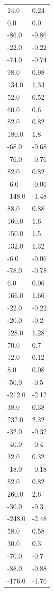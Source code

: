 \begin{longtable}{ll}
24.0 & 0.24 \\
0.0 & 0.0 \\
-86.0 & -0.86 \\
-22.0 & -0.22 \\
-74.0 & -0.74 \\
98.0 & 0.98 \\
134.0 & 1.34 \\
52.0 & 0.52 \\
60.0 & 0.6 \\
82.0 & 0.82 \\
180.0 & 1.8 \\
-68.0 & -0.68 \\
-76.0 & -0.76 \\
82.0 & 0.82 \\
-6.0 & -0.06 \\
-148.0 & -1.48 \\
88.0 & 0.88 \\
160.0 & 1.6 \\
150.0 & 1.5 \\
132.0 & 1.32 \\
-6.0 & -0.06 \\
-78.0 & -0.78 \\
6.0 & 0.06 \\
166.0 & 1.66 \\
-22.0 & -0.22 \\
-20.0 & -0.2 \\
128.0 & 1.28 \\
70.0 & 0.7 \\
12.0 & 0.12 \\
8.0 & 0.08 \\
-50.0 & -0.5 \\
-212.0 & -2.12 \\
38.0 & 0.38 \\
232.0 & 2.32 \\
-32.0 & -0.32 \\
-40.0 & -0.4 \\
32.0 & 0.32 \\
-18.0 & -0.18 \\
82.0 & 0.82 \\
260.0 & 2.6 \\
-30.0 & -0.3 \\
-248.0 & -2.48 \\
58.0 & 0.58 \\
30.0 & 0.3 \\
-70.0 & -0.7 \\
-88.0 & -0.88 \\
-176.0 & -1.76 \\

\end{longtable}
